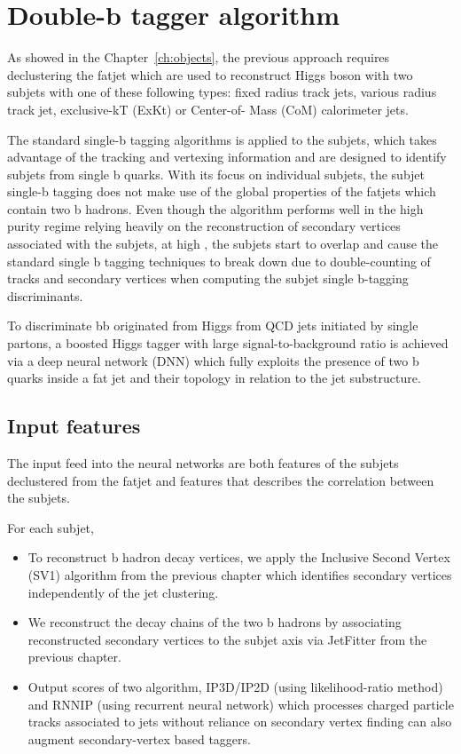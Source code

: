\section{Double-b tagger algorithm}
\label{sec:algo}
\par As showed in the Chapter~\ref{ch:objects}, the previous approach requires declustering the fatjet which are used to reconstruct Higgs boson with two subjets with one of these following types: fixed radius track jets, various radius track jet, exclusive-kT (ExKt) or Center-of- Mass (CoM) calorimeter jets.	
\par The standard single-b tagging algorithms is applied to the subjets, which takes advantage of the tracking and vertexing information and are designed to identify subjets from single b quarks. With its focus on individual subjets, the subjet single-b tagging does not make use of the global properties of the fatjets which contain two b hadrons. Even though the algorithm performs well in the high purity regime relying heavily on the reconstruction of secondary vertices associated with the subjets, at high \pt, the subjets start to overlap and cause the standard single b tagging techniques to break down due to double-counting of tracks and secondary vertices when computing the subjet single b-tagging discriminants. 
\par To discriminate bb originated from Higgs from QCD jets initiated by single partons, a boosted Higgs tagger with large signal-to-background ratio is achieved via a deep neural network (DNN) which fully exploits the presence of two b quarks inside a fat jet and their topology in relation to the jet substructure. 

\subsection{Input features}

\par The input feed into the neural networks are both features of the subjets declustered from the fatjet and features that describes the correlation between the subjets.
\par For each subjet,
\begin{itemize}


\item To reconstruct b hadron decay vertices, we apply the Inclusive Second Vertex (SV1) algorithm from the previous chapter which identifies secondary vertices independently of the jet clustering. 
\item We reconstruct the decay chains of the two b hadrons by associating reconstructed secondary vertices to the subjet axis via JetFitter from the previous chapter. 		 
\item Output scores of two algorithm, IP3D/IP2D (using likelihood-ratio method) and RNNIP (using recurrent neural network) which processes charged particle tracks associated to jets without reliance on secondary 
    vertex finding can also augment secondary-vertex based taggers. 
\end{itemize}


